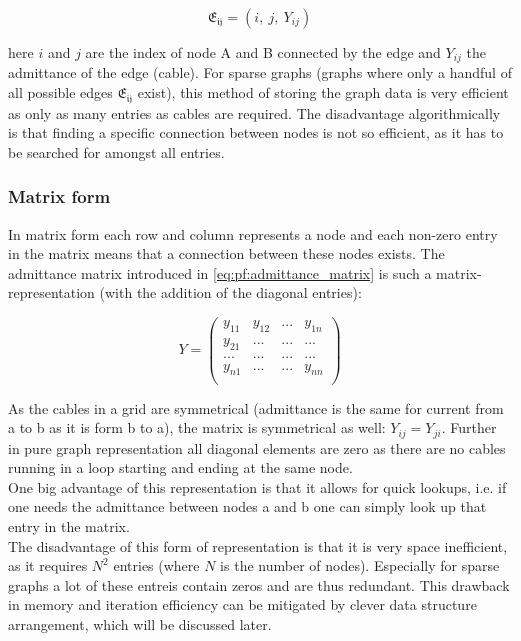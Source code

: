 \begin{equation}    
    \mathfrak{E_{ij}} = (i,\ j,\ Y_{ij})
    \label{eq:graph_theory:edge_list}
\end{equation}

here $i$ and $j$ are the index of node A and B connected by the edge and
$Y_{ij}$ the admittance of the edge (cable).
For sparse graphs (graphs where only a handful of all possible edges $\mathfrak{E_{ij}}$ exist), this method
of storing the graph data is very efficient as only as many entries as cables are required. The disadvantage
algorithmically is that finding a specific connection between nodes is not so efficient,
as it has to be searched for amongst
all entries.

\subsubsection{Matrix form}

In matrix form each row and column represents a node and each non-zero
entry in the matrix means that a connection between these nodes exists.
The admittance matrix introduced in \autoref{eq:pf:admittance_matrix}
is such a matrix-representation (with the addition of the diagonal entries):

\begin{equation}
    Y =
    \begin{pmatrix}
        y_{11} & y_{12} & ... & y_{1n}\\
        y_{21} & ...    & ... & ...   \\
        ...    & ...    & ... & ...   \\
        y_{n1} & ...    & ... & y_{nn}\\
    \end{pmatrix}
\end{equation}

As the cables in a grid are symmetrical (admittance is the same for current
from a to b as it is form b to a), 
the matrix is symmetrical as well: $Y_{ij} = Y_{ji}$.
 Further in pure graph representation all diagonal elements are
zero as there are no cables running in a loop starting and ending at the same node.\\ 
One big advantage of this representation is that it allows for
quick lookups, i.e. if one needs the admittance between nodes a and b
one can simply look up that entry in the matrix.\\
The disadvantage of this form of representation is that it is very space inefficient, as it requires
$N^2$ entries (where $N$ is the number of nodes). Especially for sparse graphs a lot of these entreis contain
zeros and are thus redundant. This drawback in memory and iteration efficiency
can be mitigated by clever data structure arrangement, which will be discussed later. 

